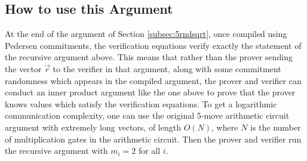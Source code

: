 \subsection{How to use this Argument}

At the end of the argument of Section \ref{subsec:5rndsqrt}, once compiled using Pedersen commitments, the verification equations verify exactly the statement of the recursive argument above. This means that rather than the prover sending the vector $\vec{r}$ to the verifier in that argument, along with some commitment randomness which appears in the compiled argument, the prover and verifier can conduct an inner product argument like the one above to prove that the prover knows values which satisfy the verification equations. To get a logarithmic communication complexity, one can use the original 5-move arithmetic circuit argument with extremely long vectors, of length $O(N)$, where $N$ is the number of multiplication gates in the arithmetic circuit. Then the prover and verifier run the recursive argument with $m_i = 2$ for all $i$.

